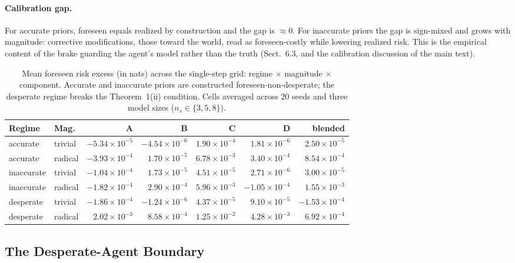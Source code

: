 \documentclass[runningheads]{llncs}
\begin{document}
\paragraph{Calibration gap.} For accurate priors, foreseen equals
realized by construction and the gap is $\approx 0$. For inaccurate
priors the gap is sign-mixed and grows with magnitude: corrective
modifications, those toward the world, read as foreseen-costly while
lowering realized risk. This is the empirical content of the brake
guarding the agent's model rather than the truth
(Sect.~6.3, and the calibration discussion of the
main text).
 
\begin{table}[t]
\centering
\caption{Mean foreseen risk excess (in nats) across the single-step grid:
regime $\times$ magnitude $\times$ component. Accurate and inaccurate
priors are constructed foreseen-non-desperate; the desperate regime
breaks the Theorem~1(ii) condition. Cells averaged
across 20 seeds and three model sizes ($n_s\in\{3,5,8\}$).}
\label{tab:grid_summary}
\begin{tabular}{llrrrrr}
\toprule
Regime & Mag. & A & B & C & D & blended \\
\midrule
accurate & trivial & $-5.34\!\times\!10^{-5}$ & $-4.54\!\times\!10^{-6}$ & $1.90\!\times\!10^{-4}$ & $1.81\!\times\!10^{-6}$ & $2.50\!\times\!10^{-5}$ \\
accurate & radical & $-3.93\!\times\!10^{-4}$ & $1.70\!\times\!10^{-5}$ & $6.78\!\times\!10^{-3}$ & $3.40\!\times\!10^{-4}$ & $8.54\!\times\!10^{-4}$ \\
inaccurate & trivial & $-1.04\!\times\!10^{-4}$ & $1.73\!\times\!10^{-5}$ & $4.51\!\times\!10^{-5}$ & $2.71\!\times\!10^{-6}$ & $3.00\!\times\!10^{-5}$ \\
inaccurate & radical & $-1.82\!\times\!10^{-4}$ & $2.90\!\times\!10^{-4}$ & $5.96\!\times\!10^{-3}$ & $-1.05\!\times\!10^{-4}$ & $1.55\!\times\!10^{-3}$ \\
desperate & trivial & $-1.86\!\times\!10^{-4}$ & $-1.24\!\times\!10^{-6}$ & $4.37\!\times\!10^{-5}$ & $9.10\!\times\!10^{-5}$ & $-1.53\!\times\!10^{-4}$ \\
desperate & radical & $2.02\!\times\!10^{-3}$ & $8.58\!\times\!10^{-4}$ & $1.25\!\times\!10^{-2}$ & $4.28\!\times\!10^{-3}$ & $6.92\!\times\!10^{-4}$ \\
\bottomrule
\end{tabular}
\end{table}
 
\subsection{The Desperate-Agent Boundary}\label{app:brake-floor}
 
\end{document}
